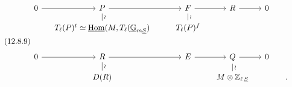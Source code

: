\begin{equation}\tag{12.8.9}
\begin{tikzcd}[row sep=small, column sep=small]
0 \arrow[r] & P \arrow[rr] \arrow[d, dash, "\wr"] & & F \arrow[r] \arrow[d, dash, "\wr"] & R \arrow[r] & 0 & \\
& T_\ell(P)^t \simeq \underline{\mathrm{Hom}}(M,T_\ell(\underline{\mathbb{G}}_{m\underline{S}}) & & T_\ell(P)^f & & & \\
& & & & & & \\
0 \arrow[r] & R \arrow[rr] \arrow[d, dash, "\wr"] & & E \arrow[r] & Q \arrow[r] \arrow[d, dash, "\wr"] & 0 & \\
& D(R) & & & M \otimes \mathbb{Z}_{\ell\,\underline{S}} & & .
\end{tikzcd}
\end{equation}

